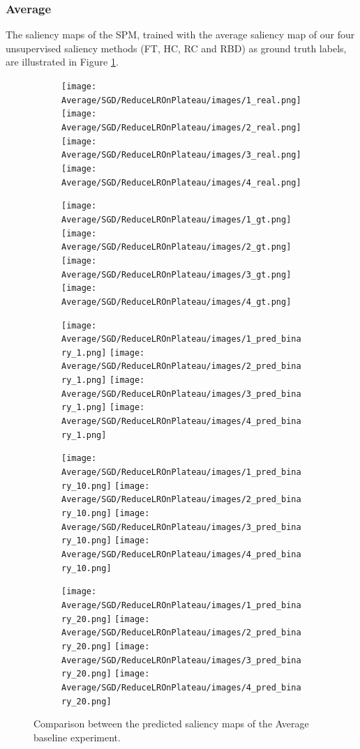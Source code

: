 \documentclass{article}
\begin{document}
\subsubsection{Average}

The saliency maps of the SPM, trained with the average saliency map of our four unsupervised saliency methods (FT, HC, RC and RBD) as ground truth labels, are illustrated in Figure \ref{fig:average_sm}.

\begin{figure}[p]
  \centering
  \begin{subfigure}[c]{0.19\textwidth}
    \centering
      \texttt{[image: Average/SGD/ReduceLROnPlateau/images/1\_real.png]}
      \texttt{[image: Average/SGD/ReduceLROnPlateau/images/2\_real.png]}
      \texttt{[image: Average/SGD/ReduceLROnPlateau/images/3\_real.png]}
      \texttt{[image: Average/SGD/ReduceLROnPlateau/images/4\_real.png]}
  \end{subfigure}
  \begin{subfigure}[c]{0.19\textwidth}
    \centering
      \texttt{[image: Average/SGD/ReduceLROnPlateau/images/1\_gt.png]}
      \texttt{[image: Average/SGD/ReduceLROnPlateau/images/2\_gt.png]}
      \texttt{[image: Average/SGD/ReduceLROnPlateau/images/3\_gt.png]}
      \texttt{[image: Average/SGD/ReduceLROnPlateau/images/4\_gt.png]}
  \end{subfigure}
  \begin{subfigure}[c]{0.19\textwidth}
    \centering
    \texttt{[image: Average/SGD/ReduceLROnPlateau/images/1\_pred\_binary\_1.png]}
    \texttt{[image: Average/SGD/ReduceLROnPlateau/images/2\_pred\_binary\_1.png]}
    \texttt{[image: Average/SGD/ReduceLROnPlateau/images/3\_pred\_binary\_1.png]}
    \texttt{[image: Average/SGD/ReduceLROnPlateau/images/4\_pred\_binary\_1.png]}
  \end{subfigure}
  \begin{subfigure}[c]{0.19\textwidth}
    \centering
    \texttt{[image: Average/SGD/ReduceLROnPlateau/images/1\_pred\_binary\_10.png]}
    \texttt{[image: Average/SGD/ReduceLROnPlateau/images/2\_pred\_binary\_10.png]}
    \texttt{[image: Average/SGD/ReduceLROnPlateau/images/3\_pred\_binary\_10.png]}
    \texttt{[image: Average/SGD/ReduceLROnPlateau/images/4\_pred\_binary\_10.png]}
  \end{subfigure}
  \begin{subfigure}[c]{0.19\textwidth}
    \centering
    \texttt{[image: Average/SGD/ReduceLROnPlateau/images/1\_pred\_binary\_20.png]}
    \texttt{[image: Average/SGD/ReduceLROnPlateau/images/2\_pred\_binary\_20.png]}
    \texttt{[image: Average/SGD/ReduceLROnPlateau/images/3\_pred\_binary\_20.png]}
    \texttt{[image: Average/SGD/ReduceLROnPlateau/images/4\_pred\_binary\_20.png]}
  \end{subfigure}
  \caption{Comparison between the predicted saliency maps of the Average baseline experiment.}
  \label{fig:average_sm}
\end{figure}
\end{document}
